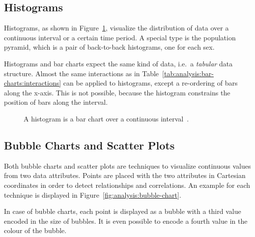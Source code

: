\subsection{Histograms}


Histograms, as shown in Figure~\ref{fig:analysis:histograms}, visualize the distribution of data over a continuous interval or a certain time period.
A special type is the population pyramid, which is a pair of back-to-back histograms, one for each sex.

Histograms and bar charts expect the same kind of data, i.e.\ a \emph{tabular} data structure.
Almost the same interactions as in Table~\ref{tab:analysis:bar-charts:interactions} can be applied to histograms, except a re-ordering of bars along the x-axis.
This is not possible, because the histogram constrains the position of bars along the interval.

\begin{figure}
  \centering
  \qquad
  \caption{A histogram is a bar chart over a continuous interval~\parencite{VisualizationCatalogue2017}.}%
  \label{fig:analysis:histograms}
\end{figure}

\subsection{Bubble Charts and Scatter Plots}

Both bubble charts and scatter plots are techniques to visualize continuous values from two data attributes.
Points are placed with the two attributes in Cartesian coordinates in order to detect relationships and correlations.
An example for each technique is displayed in Figure~\ref{fig:analysis:bubble-chart}.

In case of bubble charts, each point is displayed as a bubble with a third value encoded in the size of bubbles.
It is even possible to encode a fourth value in the colour of the bubble.

